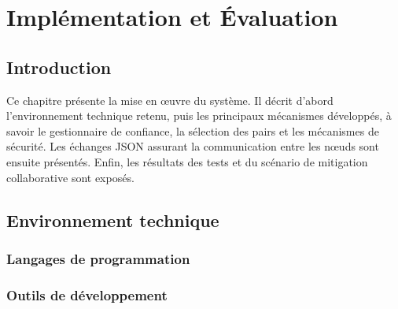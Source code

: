 \chapter{Implémentation et Évaluation}
\label{chap:implementation}

\section{Introduction}

Ce chapitre présente la mise en œuvre du système. Il décrit d'abord l'environnement technique retenu, puis les principaux mécanismes développés, à savoir le gestionnaire de confiance, la sélection des pairs et les mécanismes de sécurité. Les échanges JSON assurant la communication entre les nœuds sont ensuite présentés. Enfin, les résultats des tests et du scénario de mitigation collaborative sont exposés.

\section{Environnement technique}
\label{sec:env_tech}



\subsection{Langages de programmation}



\subsection{Outils de développement}

